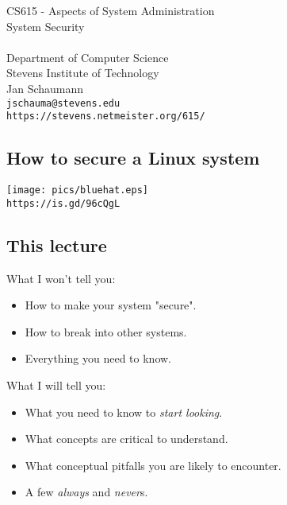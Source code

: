 \documentclass[xga]{xdvislides}
\begin{document}
\setfontphv

\lhead{\slidetitle}                               %
\cfoot{\relax}                               %
\rfoot{\Gray{\today}}
\vspace*{\fill}
\begin{center}
	\Hugesize
		CS615 - Aspects of System Administration\\ [1em]
		System Security\\ [1em]
	\hspace*{5mm}\blueline\\ [1em]
	\Normalsize
		Department of Computer Science\\
		Stevens Institute of Technology\\
		Jan Schaumann\\
		\verb+jschauma@stevens.edu+ \\
		\verb+https://stevens.netmeister.org/615/+
\end{center}
\vspace*{\fill}

\subsection{How to secure a Linux system}
\vspace*{\fill}
\begin{center}
	\texttt{[image: pics/bluehat.eps]} \\
	\vspace{.25in}
	\verb+https://is.gd/96cQgL+
\end{center}
\vspace*{\fill}


\subsection{This lecture}
What I won't tell you:
\begin{itemize}
	\item How to make your system "secure".
	\item How to break into other systems.
	\item Everything you need to know.
\end{itemize}
\vspace{.5in}
What I will tell you:
\begin{itemize}
	\item What you need to know to {\em start looking}.
	\item What concepts are critical to understand.
	\item What conceptual pitfalls you are likely to encounter.
	\item A few {\em always} and {\em never}s.
\end{itemize}
\end{document}
